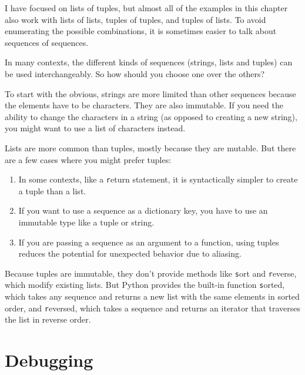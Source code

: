 \documentclass[
DIV=11,
fontsize=13,
twoside,
headinclude=false,
titlepage=firstiscover,
abstract=true,
headsepline=true,
footsepline=true,
chapterprefix=true, %
headings=big,
bibliography=totoc,%
captions=tableheading
]{scrbook}
\theoremstyle{definition}
\begin{document}
I have focused on lists of tuples, but almost all of the examples in
this chapter also work with lists of lists, tuples of tuples, and
tuples of lists.  To avoid enumerating the possible combinations, it
is sometimes easier to talk about sequences of sequences.

In many contexts, the different kinds of sequences (strings, lists and
tuples) can be used interchangeably.  So how should you choose one
over the others?

To start with the obvious, strings are more limited than other
sequences because the elements have to be characters.  They are
also immutable.  If you need the ability to change the characters
in a string (as opposed to creating a new string), you might
want to use a list of characters instead.

Lists are more common than tuples, mostly because they are mutable.
But there are a few cases where you might prefer tuples:

\begin{enumerate}

\item In some contexts, like a {\texttt return} statement, it is
syntactically simpler to create a tuple than a list.

\item If you want to use a sequence as a dictionary key, you
have to use an immutable type like a tuple or string.

\item If you are passing a sequence as an argument to a function,
using tuples reduces the potential for unexpected behavior
due to aliasing.

\end{enumerate}

Because tuples are immutable, they don't provide methods like {\texttt
  sort} and {\texttt reverse}, which modify existing lists.  But Python
provides the built-in function {\texttt sorted}, which takes any sequence
and returns a new list with the same elements in sorted order, and
{\texttt reversed}, which takes a sequence and returns an iterator that
traverses the list in reverse order.
 


\section{Debugging}
\end{document}
